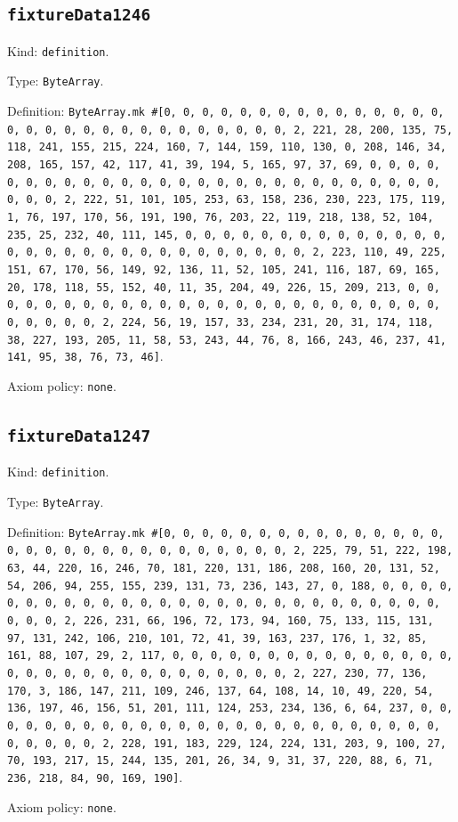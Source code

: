 \documentclass[11pt]{article}
\begin{document}
\subsection*{\texttt{fixtureData1246}}
\noindent Kind: \texttt{definition}.\par
\noindent Type: \texttt{ByteArray}.\par
\noindent Definition: \texttt{ByteArray.mk \#[0, 0, 0, 0, 0, 0, 0, 0, 0, 0, 0, 0, 0, 0, 0, 0, 0, 0, 0, 0, 0, 0, 0, 0, 0, 0, 0, 0, 0, 0, 2, 221, 28, 200, 135, 75, 118, 241, 155, 215, 224, 160, 7, 144, 159, 110, 130, 0, 208, 146, 34, 208, 165, 157, 42, 117, 41, 39, 194, 5, 165, 97, 37, 69, 0, 0, 0, 0, 0, 0, 0, 0, 0, 0, 0, 0, 0, 0, 0, 0, 0, 0, 0, 0, 0, 0, 0, 0, 0, 0, 0, 0, 0, 0, 2, 222, 51, 101, 105, 253, 63, 158, 236, 230, 223, 175, 119, 1, 76, 197, 170, 56, 191, 190, 76, 203, 22, 119, 218, 138, 52, 104, 235, 25, 232, 40, 111, 145, 0, 0, 0, 0, 0, 0, 0, 0, 0, 0, 0, 0, 0, 0, 0, 0, 0, 0, 0, 0, 0, 0, 0, 0, 0, 0, 0, 0, 0, 0, 2, 223, 110, 49, 225, 151, 67, 170, 56, 149, 92, 136, 11, 52, 105, 241, 116, 187, 69, 165, 20, 178, 118, 55, 152, 40, 11, 35, 204, 49, 226, 15, 209, 213, 0, 0, 0, 0, 0, 0, 0, 0, 0, 0, 0, 0, 0, 0, 0, 0, 0, 0, 0, 0, 0, 0, 0, 0, 0, 0, 0, 0, 0, 0, 2, 224, 56, 19, 157, 33, 234, 231, 20, 31, 174, 118, 38, 227, 193, 205, 11, 58, 53, 243, 44, 76, 8, 166, 243, 46, 237, 41, 141, 95, 38, 76, 73, 46]}.\par
\noindent Axiom policy: \texttt{none}.\par
\subsection*{\texttt{fixtureData1247}}
\noindent Kind: \texttt{definition}.\par
\noindent Type: \texttt{ByteArray}.\par
\noindent Definition: \texttt{ByteArray.mk \#[0, 0, 0, 0, 0, 0, 0, 0, 0, 0, 0, 0, 0, 0, 0, 0, 0, 0, 0, 0, 0, 0, 0, 0, 0, 0, 0, 0, 0, 0, 2, 225, 79, 51, 222, 198, 63, 44, 220, 16, 246, 70, 181, 220, 131, 186, 208, 160, 20, 131, 52, 54, 206, 94, 255, 155, 239, 131, 73, 236, 143, 27, 0, 188, 0, 0, 0, 0, 0, 0, 0, 0, 0, 0, 0, 0, 0, 0, 0, 0, 0, 0, 0, 0, 0, 0, 0, 0, 0, 0, 0, 0, 0, 0, 2, 226, 231, 66, 196, 72, 173, 94, 160, 75, 133, 115, 131, 97, 131, 242, 106, 210, 101, 72, 41, 39, 163, 237, 176, 1, 32, 85, 161, 88, 107, 29, 2, 117, 0, 0, 0, 0, 0, 0, 0, 0, 0, 0, 0, 0, 0, 0, 0, 0, 0, 0, 0, 0, 0, 0, 0, 0, 0, 0, 0, 0, 0, 0, 2, 227, 230, 77, 136, 170, 3, 186, 147, 211, 109, 246, 137, 64, 108, 14, 10, 49, 220, 54, 136, 197, 46, 156, 51, 201, 111, 124, 253, 234, 136, 6, 64, 237, 0, 0, 0, 0, 0, 0, 0, 0, 0, 0, 0, 0, 0, 0, 0, 0, 0, 0, 0, 0, 0, 0, 0, 0, 0, 0, 0, 0, 0, 0, 2, 228, 191, 183, 229, 124, 224, 131, 203, 9, 100, 27, 70, 193, 217, 15, 244, 135, 201, 26, 34, 9, 31, 37, 220, 88, 6, 71, 236, 218, 84, 90, 169, 190]}.\par
\noindent Axiom policy: \texttt{none}.\par
\end{document}
